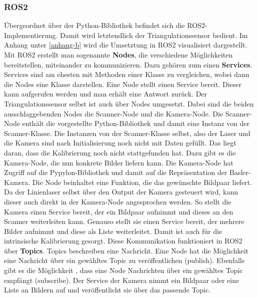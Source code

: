 		\subsubsection{ROS2}
		
		Übergeordnet über der Python-Bibliothek befindet sich die ROS2-Implementierung. Damit wird letztendlich der Triangulationssensor bedient. Im Anhang unter \ref{anhang-b} wird die Umsetztung in ROS2 visualisiert dargestellt. \newline
		Mit ROS2 erstellt man sogenannte \textbf{Nodes}, die verschiedene Möglichkeiten bereitstellen, miteinander zu kommunizieren. Dazu gehören zum einen \textbf{Services}. Services sind am ehesten mit Methoden einer Klasse zu vergleichen, wobei dann die Nodes eine Klasse darstellen. Eine Node stellt einen Service bereit. Dieser kann aufgerufen werden und man erhält eine Antwort zurück. Der Triangulationssensor selbst ist auch über Nodes umgesetzt. Dabei sind die beiden ausschlaggebenden Nodes die Scanner-Node und die Kamera-Node. Die Scanner-Node enthält die vorgestellte Python-Bibliothek und damit eine Instanz von der Scanner-Klasse. Die Instanzen von der Scanner-Klasse selbst, also der Laser und die Kamera sind nach Initialisierung noch nicht mit Daten gefüllt. Das liegt daran, dass die Kalibrierung noch nicht stattgefunden hat. Dazu gibt es die Kamera-Node, die nun konkrete Bilder liefern kann. Die Kamera-Node hat Zugriff auf die Pypylon-Bibliothek und damit auf die Repräsentation der Basler-Kamera. Die Node beinhaltet eine Funktion, die das gewünschte Bildpaar liefert. Da der Linienlaser selbst über den Output der Kamera gesteuert wird, kann dieser auch direkt in der Kamera-Node angesprochen werden. So stellt die Kamera einen Service bereit, der ein Bildpaar aufnimmt und dieses an den Scanner weiterleiten kann. Genauso stellt sie einen Service bereit, der mehrere Bilder aufnimmt und diese als Liste weiterleitet. Damit ist auch für die intrinsische Kalibrierung gesorgt. \newline
		Diese Kommunikation funktioniert in ROS2 über \textbf{Topics}. Topics beschreiben eine Nachricht. Eine Node hat die Möglichkeit eine Nachricht über ein gewähltes Topic zu \linebreak veröffentlichen (publish). Ebenfalls gibt es die Möglichkeit , dass eine Node Nachrichten über ein gewähltes Topic empfängt (subscribe). Der Service der Kamera nimmt ein Bildpaar oder eine Liste an Bildern auf und veröffentlicht sie über das passende Topic. \newline
